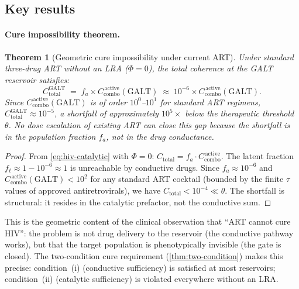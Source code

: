 \documentclass[11pt]{article}
\theoremstyle{plain}
\newtheorem{theorem}{Theorem}[section]
\theoremstyle{definition}
\newcommand{\Ccombo}{C_{\mathrm{combo}}}
\begin{document}
\subsection{Key results}
\label{sec:hiv-results}

\paragraph{Cure impossibility theorem.}

\begin{theorem}[Geometric cure impossibility under current ART]
\label{thm:cure-impossibility}
Under standard three-drug ART without an LRA ($\Phi = 0$), the
total coherence at the GALT reservoir satisfies:
\[
  C_{\mathrm{total}}^{\mathrm{GALT}} \;=\;
  f_a \times \Ccombo^{\,\mathrm{active}}(\mathrm{GALT})
  \;\approx\; 10^{-6} \times \Ccombo^{\,\mathrm{active}}(\mathrm{GALT}).
\]
Since $\Ccombo^{\,\mathrm{active}}(\mathrm{GALT})$ is of
order $10^0$--$10^1$ for standard ART regimens,
$C_{\mathrm{total}}^{\mathrm{GALT}} \approx 10^{-5}$, a
shortfall of approximately $10^5\times$ below the therapeutic
threshold $\theta$. No dose escalation of existing ART can close
this gap because the shortfall is in the population fraction
$f_a$, not in the drug conductance.
\end{theorem}

\begin{proof}
From \cref{eq:hiv-catalytic} with $\Phi = 0$:
$C_{\mathrm{total}} = f_a \cdot \Ccombo^{\,\mathrm{active}}$.
The latent fraction $f_\ell \approx 1 - 10^{-6} \approx 1$ is
unreachable by conductive drugs. Since
$f_a \approx 10^{-6}$ and
$\Ccombo^{\,\mathrm{active}}(\mathrm{GALT}) < 10^2$ for any
standard ART cocktail (bounded by the finite $\tau$ values of
approved antiretrovirals), we have
$C_{\mathrm{total}} < 10^{-4} \ll \theta$. The shortfall is
structural: it resides in the catalytic prefactor, not the
conductive sum.
\end{proof}

This is the geometric content of the clinical observation that
``ART cannot cure HIV'': the problem is not drug delivery to the
reservoir (the conductive pathway works), but that the target
population is phenotypically invisible (the gate is closed). The
two-condition cure requirement (\cref{thm:two-condition}) makes
this precise: condition~(i) (conductive sufficiency) is
satisfied at most reservoirs; condition~(ii) (catalytic
sufficiency) is violated everywhere without an LRA.
\end{document}

